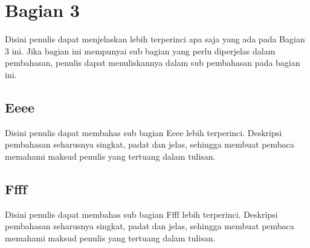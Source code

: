 \section{Bagian 3}

Disini penulis dapat menjelaskan lebih terperinci apa saja yang ada pada
Bagian 3 ini. Jika bagian ini mempunyai sub bagian yang perlu diperjelas dalam
pembahasan, penulis dapat menuliskannya dalam sub pembahasan pada bagian ini.

\subsection{Eeee}

Disini penulis dapat membahas sub bagian Eeee lebih terperinci. Deskripsi
pembahasan seharusnya singkat, padat dan jelas, sehingga membuat pembaca
memahami maksud penulis yang tertuang dalam tulisan.

\subsection{Ffff}

Disini penulis dapat membahas sub bagian Ffff lebih terperinci. Deskripsi
pembahasan seharusnya singkat, padat dan jelas, sehingga membuat pembaca
memahami maksud penulis yang tertuang dalam tulisan.
